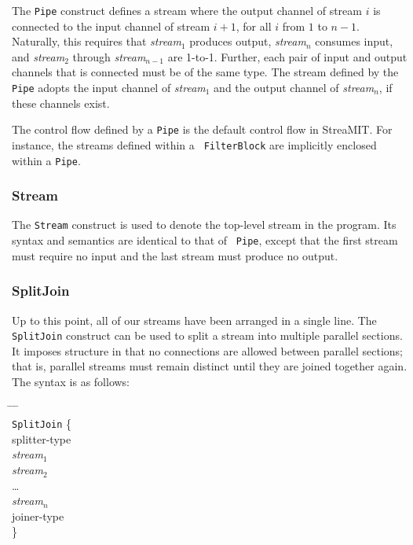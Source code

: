 \documentclass[draft]{article}
\begin{document}
The {\tt Pipe} construct defines a stream where the output channel of
stream $i$ is connected to the input channel of stream $i+1$, for all
$i$ from $1$ to $n-1$.  Naturally, this requires that {\it stream$_1$}
produces output, {\it stream$_n$} consumes input, and {\it stream$_2$}
through {\it stream$_{n-1}$} are 1-to-1.  Further, each pair of input
and output channels that is connected must be of the same type.  The
stream defined by the {\tt Pipe} adopts the input channel of {\it
stream$_1$} and the output channel of {\it stream$_n$}, if these
channels exist.

The control flow defined by a {\tt Pipe} is the default control flow
in StreaMIT.  For instance, the streams defined within a {\tt
FilterBlock} are implicitly enclosed within a {\tt Pipe}.  

\subsubsection{Stream}

The {\tt Stream} construct is used to denote the top-level stream in
the program.  Its syntax and semantics are identical to that of {\tt
Pipe}, except that the first stream must require no input and the last
stream must produce no output.

\subsubsection{SplitJoin}

Up to this point, all of our streams have been arranged in a single
line.  The {\tt SplitJoin} construct can be used to split a stream
into multiple parallel sections.  It imposes structure in that no
connections are allowed between parallel sections; that is, parallel
streams must remain distinct until they are joined together again.
The syntax is as follows:

\begin{tabbing}
\hspace{0.2in} \= \hspace{0.2in} \= \hspace{0.2in} \= \hspace{0.2in} \= \\
{\tt SplitJoin} \{ \\
\> splitter-type \\
\> {\it stream$_1$} \\
\> {\it stream$_2$} \\
\> \dots \\
\> {\it stream$_n$} \\
\> joiner-type \\
\}
\end{tabbing}
\end{document}
